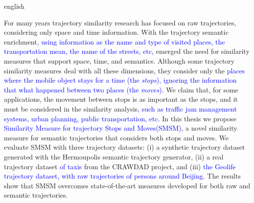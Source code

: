 {
    \begin{otherlanguage*}{english}
    \begin{resumo}[Abstract]

        For many years trajectory similarity research has focused on raw trajectories, considering only space and time information. With the trajectory semantic enrichment\textcolor{blue}{, using information as the name and type of visited places, the transportation mean, the name of the streets, etc, } emerged the need for similarity measures that support space, time, and semantics. Although some trajectory similarity measures deal with all these dimensions, they consider only the \textcolor{blue}{places where the mobile object stays for a time (the \emph{stops}), ignoring the information that what happened between two places (the \emph{moves})}. We claim that, for some applications, the movement between stops is as important as the stops, and it must be considered in the similarity analysis\textcolor{blue}{, such as traffic jam management systems, urban planning, public transportation, etc.}
        In this thesis we propose \textcolor{blue}{Similarity Measure for trajectory Stops and Moves(SMSM)}, a novel similarity measure for semantic trajectories that considers both stops and moves.
        We evaluate SMSM with three trajectory datasets: (i) a synthetic trajectory dataset generated with the Hermoupolis semantic trajectory generator, (ii) a real trajectory dataset \textcolor{blue}{of taxis} from the CRAWDAD project, and (iii) \textcolor{blue}{the Geolife trajectory dataset, with raw trajectories of persons around Beijing}. The results show that SMSM overcomes state-of-the-art measures developed for both raw and semantic trajectories.


    \end{resumo}
    \end{otherlanguage*}
}